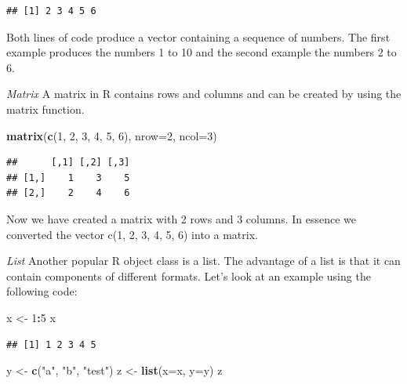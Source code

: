 \documentclass[]{book}
\newenvironment{Shaded}{\begin{snugshade}}{\end{snugshade}}
\newcommand{\KeywordTok}[1]{\textcolor[rgb]{0.13,0.29,0.53}{\textbf{#1}}}
\newcommand{\DataTypeTok}[1]{\textcolor[rgb]{0.13,0.29,0.53}{#1}}
\newcommand{\DecValTok}[1]{\textcolor[rgb]{0.00,0.00,0.81}{#1}}
\newcommand{\StringTok}[1]{\textcolor[rgb]{0.31,0.60,0.02}{#1}}
\newcommand{\OperatorTok}[1]{\textcolor[rgb]{0.81,0.36,0.00}{\textbf{#1}}}
\newcommand{\NormalTok}[1]{#1}
\begin{document}
\begin{verbatim}
## [1] 2 3 4 5 6
\end{verbatim}

Both lines of code produce a vector containing a sequence of numbers.
The first example produces the numbers 1 to 10 and the second example
the numbers 2 to 6.

\emph{Matrix} A matrix in R contains rows and columns and can be created
by using the matrix function.

\begin{Shaded}
\begin{Highlighting}[]
\KeywordTok{matrix}\NormalTok{(}\KeywordTok{c}\NormalTok{(}\DecValTok{1}\NormalTok{, }\DecValTok{2}\NormalTok{, }\DecValTok{3}\NormalTok{, }\DecValTok{4}\NormalTok{, }\DecValTok{5}\NormalTok{, }\DecValTok{6}\NormalTok{), }\DataTypeTok{nrow=}\DecValTok{2}\NormalTok{, }\DataTypeTok{ncol=}\DecValTok{3}\NormalTok{)}
\end{Highlighting}
\end{Shaded}

\begin{verbatim}
##      [,1] [,2] [,3]
## [1,]    1    3    5
## [2,]    2    4    6
\end{verbatim}

Now we have created a matrix with 2 rows and 3 columns. In essence we
converted the vector c(1, 2, 3, 4, 5, 6) into a matrix.

\emph{List} Another popular R object class is a list. The advantage of a
list is that it can contain components of different formats. Let's look
at an example using the following code:

\begin{Shaded}
\begin{Highlighting}[]
\NormalTok{x <-}\StringTok{ }\DecValTok{1}\OperatorTok{:}\DecValTok{5}
\NormalTok{x}
\end{Highlighting}
\end{Shaded}

\begin{verbatim}
## [1] 1 2 3 4 5
\end{verbatim}

\begin{Shaded}
\begin{Highlighting}[]
\NormalTok{y <-}\StringTok{ }\KeywordTok{c}\NormalTok{(}\StringTok{"a"}\NormalTok{, }\StringTok{"b"}\NormalTok{, }\StringTok{"test"}\NormalTok{)}
\NormalTok{z <-}\StringTok{ }\KeywordTok{list}\NormalTok{(}\DataTypeTok{x=}\NormalTok{x, }\DataTypeTok{y=}\NormalTok{y)}
\NormalTok{z}
\end{Highlighting}
\end{Shaded}
\end{document}
